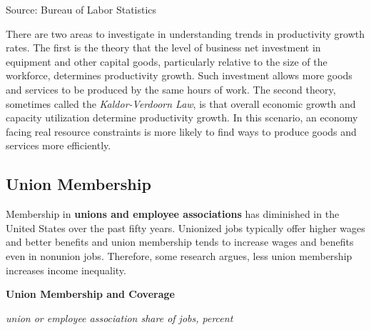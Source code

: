 \documentclass{report}
\makeatletter
\newcommand{\tbllink}[1]{\href{https://raw.githubusercontent.com/bdecon/US-chartbook/master/chartbook/data/#1}{\faTable}}
\newcommand*\short[1]{\expandafter\@gobbletwo\number\numexpr#1\relax}
\newcommand{\ctsbar}[5]{
		\addplot[ybar stacked, bar width=#5, draw opacity=0, fill=#1] 
			table [x=#2, y=#3, col sep=comma]{#4};}
\newcommand{\dateaxisticks}{
		date coordinates in=x, axis line style={draw=none},
		xmax={2020-10-01},
		max space between ticks=40,	    
		xtick={{1990-01-01}, {1992-01-01}, {1994-01-01}, 
			{1996-01-01}, {1998-01-01}, {2000-01-01}, 
			{2002-01-01}, {2004-01-01}, {2006-01-01},
			{2008-01-01}, {2010-01-01}, {2012-01-01}, {2014-01-01},
		    {2016-01-01}, {2018-01-01}, {2020-01-01}},
		minor xtick={{1989-01-01}, {1991-01-01}, {1993-01-01},
			{1995-01-01}, {1997-01-01}, {1999-01-01}, 
			{2001-01-01}, {2003-01-01}, {2005-01-01}, {2007-01-01},
		    {2009-01-01}, {2011-01-01}, {2013-01-01}, {2015-01-01},
		    {2017-01-01}, {2019-01-01}},
		enlarge y limits={0.06}, enlarge x limits={0.01},
		}
\newcommand{\bbar}[2]{extra #1 ticks = {{#2}}, extra #1 tick labels = ,
		extra #1 tick style = {grid=major, grid style={thick, black!25}},}
\newcommand{\rbars}{
		\fill[color=black!10] (axis cs:{1990-07-01},\pgfkeysvalueof{/pgfplots/ymin}) rectangle 
			(axis cs:{1991-03-01}, \pgfkeysvalueof{/pgfplots/ymax});
		\fill[color=black!10] (axis cs:{2007-12-01},\pgfkeysvalueof{/pgfplots/ymin}) rectangle 
			(axis cs:{2009-07-01}, \pgfkeysvalueof{/pgfplots/ymax});
		\fill[color=black!10] (axis cs:{2001-03-01},\pgfkeysvalueof{/pgfplots/ymin}) rectangle 
			(axis cs:{2001-11-01}, \pgfkeysvalueof{/pgfplots/ymax});
		\fill[color=black!10] (axis cs:{2020-02-01},\pgfkeysvalueof{/pgfplots/ymin}) rectangle 
			(axis cs:{2020-10-01}, \pgfkeysvalueof{/pgfplots/ymax});}
\makeatother
\begin{document}
{{{{{{{{{\begin{minipage}{0.76\textwidth}
\footnotesize{Source: Bureau of Labor Statistics} \hfill \tbllink{lprod.csv}

\vspace{5mm}

\small There are two areas to investigate in understanding trends in productivity growth rates. The first is the theory that the level of business net investment in equipment and other capital goods, particularly relative to the size of the workforce, determines productivity growth. Such investment allows more goods and services to be produced by the same hours of work. The second theory, sometimes called the \textit{Kaldor-Verdoorn Law}, is that overall economic growth and capacity utilization determine productivity growth. In this scenario, an economy facing real resource constraints is more likely to find ways to produce goods and services more efficiently.
\end{minipage}
\newpage
\begin{minipage}{0.76\textwidth}
\subsection*{\color{black!70} \seriffont Union Membership}
\small Membership in \textbf{unions and employee associations} has diminished in the United States over the past fifty years. Unionized jobs typically offer higher wages and better benefits and union membership tends to increase wages and benefits even in nonunion jobs. Therefore, some research argues, less union membership increases income inequality. \\



\vspace{5mm}

\normalsize \textbf{Union Membership and Coverage}

\footnotesize{\textit{union or employee association share of jobs, percent}}

\hspace*{-2mm} 


\end{minipage}}}}}}}}}}
\end{document}
